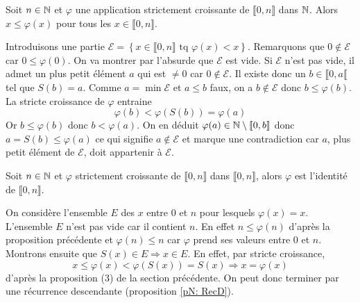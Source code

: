 \begin{prop}[\ref{pN: ScMin}]
 Soit $n\in \mathbb{N}$ et $\varphi$ une application strictement croissante de $\llbracket 0, n\rrbracket$ dans $\mathbb{N}$. Alors $x\leq \varphi(x)$ pour tous les $x\in \llbracket 0, n\rrbracket$.
\end{prop}
\begin{demo}
 Introduisons une partie $\mathcal{E} = \left\lbrace x\in \llbracket 0, n \rrbracket \text{ tq } \varphi(x)<x\right\rbrace$. Remarquons que $0\notin \mathcal{E}$ car $0\leq \varphi(0)$.\newline
On va montrer par l'absurde que $\mathcal{E}$ est vide.\newline
Si $\mathcal{E}$ n'est pas vide, il admet un plus petit élément $a$ qui est $\neq 0$ car $0\notin \mathcal{E}$. Il existe donc un $b\in\llbracket 0, a \llbracket$ tel que $S(b)=a$. Comme $a=\min \mathcal{E}$ et $a\leq b$ faux, on a $b\notin \mathcal{E}$ donc $b\leq \varphi(b)$. La stricte croissance de $\varphi$ entraine
\begin{displaymath}
 \varphi(b) < \varphi(S(b)) = \varphi(a)
\end{displaymath}
Or $b\leq \varphi(b)$ donc $b < \varphi(a)$. On en déduit $\varphi(a) \in \mathbb{N} \setminus \llbracket 0, b\rrbracket$ donc $a=S(b)\leq \varphi(a)$ ce qui signifie $a\notin \mathcal{E}$ et marque une contradiction car $a$, plus petit élément de $\mathcal{E}$, doit appartenir à $\mathcal{E}$.
\end{demo}

\begin{lemn}\label{lN: ScId}
 Soit $n\in\mathbb{N}$ et $\varphi$ strictement croissante de $\llbracket 0,n \rrbracket$ dans $\llbracket 0,n \rrbracket$, alors $\varphi$ est l'identité de $\llbracket 0,n \rrbracket$.
\end{lemn}
\begin{demo}
 On considère l'ensemble $E$ des $x$ entre $0$ et $n$ pour lesquels $\varphi(x)=x$.\newline
L'ensemble $E$ n'est pas vide car il contient $n$. En effet $n\leq \varphi(n)$ d'après la proposition précédente et $\varphi(n)\leq n$ car $\varphi$ prend ses valeurs entre $0$ et $n$.\newline
Montrons ensuite que $S(x)\in E \Rightarrow x\in E$. En effet, par stricte croissance,
\begin{displaymath}
 x\leq \varphi(x) < \varphi(S(x))= S(x)\Rightarrow x=\varphi(x)
\end{displaymath}
d'après la proposition (3) de la section précédente. On peut donc terminer par une récurrence descendante (proposition \ref{pN: RecD}).
\end{demo}

